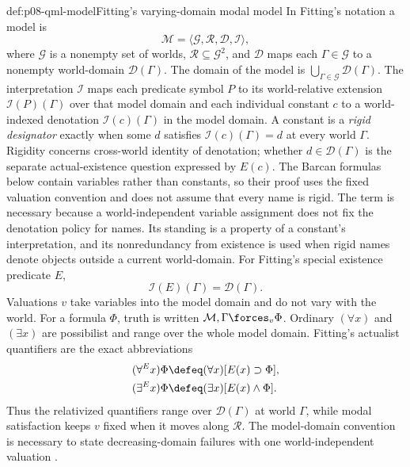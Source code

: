 \begin{hbdefinition}{def:p08-qml-model}{Fitting's varying-domain modal model}
In Fitting's notation a model is
\[
 \mathcal M=\langle\mathcal G,\mathcal R,\mathcal D,\mathcal I\rangle,
\]
where \(\mathcal G\) is a nonempty set of worlds,
\(\mathcal R\subseteq\mathcal G^2\), and
\(\mathcal D\) maps each \(\Gamma\in\mathcal G\) to a nonempty world-domain
\(\mathcal D(\Gamma)\).  The domain of the model is
\(\bigcup_{\Gamma\in\mathcal G}\mathcal D(\Gamma)\).  The interpretation
\(\mathcal I\) maps each predicate symbol \(P\) to its world-relative
extension \(\mathcal I(P)(\Gamma)\) over that model domain and each individual
constant \(c\) to a world-indexed denotation
\(\mathcal I(c)(\Gamma)\) in the model domain.  A constant is a
\emph{rigid designator} exactly when some \(d\) satisfies
\(\mathcal I(c)(\Gamma)=d\) at every world \(\Gamma\).  Rigidity concerns
cross-world identity of denotation; whether \(d\in\mathcal D(\Gamma)\) is the
separate actual-existence question expressed by \(E(c)\).  The Barcan formulas
below contain variables rather than constants, so their proof uses the fixed
valuation convention and does not assume that every name is rigid.
The term is necessary because a world-independent variable assignment does not
fix the denotation policy for names.  Its standing is a property of a constant's
interpretation, and its nonredundancy from existence is used when rigid names
denote objects outside a current world-domain.  For Fitting's special
existence predicate \(E\),
\[
 \mathcal I(E)(\Gamma)=\mathcal D(\Gamma).
\]
Valuations \(v\) take variables into the model domain and do not vary with the
world.  For a formula \(\Phi\), truth is written
\(\mathcal M,\Gamma\forces_v\Phi\).  Ordinary
\((\forall x)\) and \((\exists x)\) are possibilist and range over the whole
model domain.  Fitting's actualist quantifiers are the exact abbreviations
\[
\begin{aligned}
 (\forall^{E}x)\Phi
 &\defeq (\forall x)[E(x)\supset\Phi],\\
 (\exists^{E}x)\Phi
 &\defeq (\exists x)[E(x)\land\Phi].
\end{aligned}
\]
Thus the relativized quantifiers range over \(\mathcal D(\Gamma)\) at world
\(\Gamma\), while modal satisfaction keeps \(v\) fixed when it moves along
\(\mathcal R\).  The model-domain convention is necessary to state
decreasing-domain failures with one world-independent valuation
\cite{Fitting2002Alethic,FittingMendelsohn1998}.
\end{hbdefinition}

